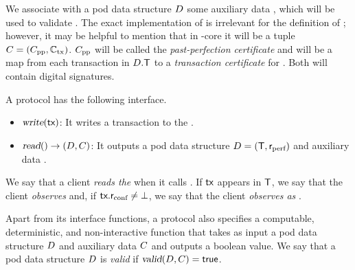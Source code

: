 \begin{definition}
    We associate with a pod data structure $D$ some auxiliary data \cert, which will be used to validate \Pod.
    The exact implementation of \cert is irrelevant for the definition of \podtm;
    however, it may be helpful to mention that in \podtm-core it will be a tuple $C = (C_\text{pp}, \mathbb{C}_\text{tx})$.
    $C_\text{pp}$ will be called the \emph{past-perfection certificate} and \alltxcert will be a map from each transaction \tx in $D.\textsf{T}$ to a \emph{transaction certificate} \txcert for \tx.
    Both will contain digital signatures.
\end{definition}

\begin{definition}\label{def:podinterface}
A \podtm protocol has the following interface.
\begin{itemize}
    \item $\textsl{write}(\textsf{tx})$:
    It writes a transaction \tx to the \podtm.

    \item $\textsl{read}() \rightarrow (D, C)$:
    It outputs a pod data structure $D = (\textsf{T}, \textsf{r}_\text{perf})$ and auxiliary data \cert.
\end{itemize}
\end{definition}
We say that a client \emph{reads the} \podtm when it calls \opread{}.
If $\textsf{tx}$ appears in $\textsf{T}$,
 we say that the client \emph{observes} \tx and, if $\textsf{tx}.\textsf{r}_\text{conf} \neq \bot$, we say that the client \emph{observes \tx as \confirmed}.

\begin{definition}
    Apart from its interface functions,
    a \podtm protocol also specifies a computable, deterministic, and non-interactive function \opValid{\Pod, \cert} that takes as input a pod data structure $D$ and auxiliary data $C$ and outputs a boolean value. We say that a pod data structure $D$ is \emph{valid} if $\textsl{valid}(D, C) = \mathsf{true}$.
\end{definition}



